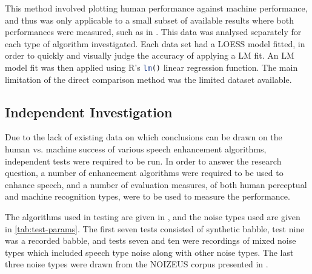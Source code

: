 This method involved plotting human performance against machine performance,
and thus was only applicable to a small subset of available results
where both performances were measured, such as in \citep{Paliwal2010}.
This data was analysed separately for each type of algorithm investigated.
Each data set had a \ac{LOESS} model fitted, in order to quickly
and visually judge the accuracy of applying a \ac{LM} fit. An \ac{LM}
model fit was then applied using R's \lstinline[language=R]!lm()!
linear regression function. The main limitation of the direct comparison
method was the limited dataset available.


\subsection{\label{sub:Independent-Investigation-Meth}Independent Investigation}

Due to the lack of existing data on which conclusions can be drawn
on the human vs. machine success of various speech enhancement algorithms,
independent tests were required to be run. In order to answer the
research question, a number of enhancement algorithms were required
to be used to enhance speech, and a number of evaluation measures,
of both human perceptual and machine recognition types, were to be
used to measure the performance.

The algorithms used in testing are given in ,
and the noise types used are given in \ref{tab:test-params}. The
first seven tests consisted of synthetic babble, test nine was a recorded
babble, and tests seven and ten were recordings of mixed noise types
which included speech type noise along with other noise types. The
last three noise types were drawn from the NOIZEUS corpus presented
in \citep{Hu2006}.

